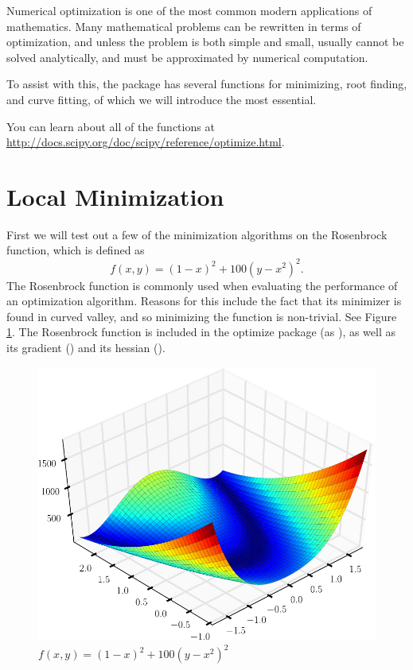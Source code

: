 \label{lab:Optimization1}

Numerical optimization is one of the most common modern applications of mathematics. 
Many mathematical problems can be rewritten in terms of optimization, and unless the problem is both simple and small, usually cannot be solved analytically, and must be approximated by numerical computation. 

To assist with this, the  package has several functions for minimizing, root finding, and curve fitting, of which we will introduce the most essential.

You can learn about all of the functions at \url{http://docs.scipy.org/doc/scipy/reference/optimize.html}.

\section*{Local Minimization} %

First we will test out a few of the minimization algorithms on the Rosenbrock function, which is defined as
\[
f(x,y) = (1-x)^2 + 100(y-x^2)^2.
\]
The Rosenbrock function is commonly used when evaluating the performance of an optimization algorithm.
Reasons for this include the fact that its minimizer  is found in  curved valley, and so minimizing the function is non-trivial.
See Figure \ref{opt:rosenbrock}.
The Rosenbrock function is included in the optimize package (as ), as well as its gradient () and its hessian ().

\begin{figure}
\includegraphics[width=\textwidth]{Rosenbrock.pdf}
\caption{$f(x,y) = (1-x)^2 + 100(y-x^2)^2$}
\label{opt:rosenbrock}
\end{figure}

